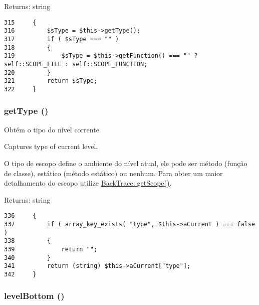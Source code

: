 \begin{Desc}
\item[Returns:]string \end{Desc}


\begin{Code}\begin{verbatim}315     {
316         $sType = $this->getType();
317         if ( $sType === "" )
318         {
319             $sType = $this->getFunction() === "" ? self::SCOPE_FILE : self::SCOPE_FUNCTION;
320         }
321         return $sType;
322     }
\end{verbatim}
\end{Code}


\hypertarget{class_back_trace_830b5c75df72b32396701bc563fbe3c7}{
\subsubsection[{getType}]{\setlength{\rightskip}{0pt plus 5cm}getType ()}}
\label{class_back_trace_830b5c75df72b32396701bc563fbe3c7}


Obtém o tipo do nível corrente.

Captures type of current level.

O tipo de escopo define o ambiente do nível atual, ele pode ser método (função de classe), estático (método estático) ou nenhum. Para obter um maior detalhamento do escopo utilize \hyperlink{class_back_trace_0dce4e854dda57ffc316fd755df9b309}{BackTrace::getScope()}.

\begin{Desc}
\item[Returns:]string \end{Desc}


\begin{Code}\begin{verbatim}336     {
337         if ( array_key_exists( "type", $this->aCurrent ) === false )
338         {
339             return "";
340         }
341         return (string) $this->aCurrent["type"];
342     }
\end{verbatim}
\end{Code}


\hypertarget{class_back_trace_947fed0ee4bf21433d5bc900cc2f7547}{
\subsubsection[{levelBottom}]{\setlength{\rightskip}{0pt plus 5cm}levelBottom ()}}
\label{class_back_trace_947fed0ee4bf21433d5bc900cc2f7547}


